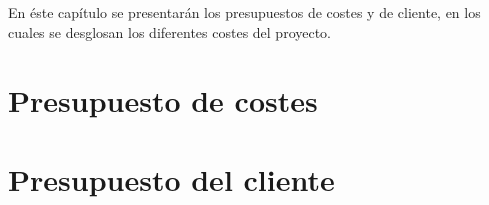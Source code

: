 En éste capítulo se presentarán los presupuestos de costes y de cliente, en los cuales se desglosan los diferentes costes del proyecto.

\section{Presupuesto de costes}
\label{presupuesto:costes}


\section{Presupuesto del cliente}
\label{presupuesto:cliente}